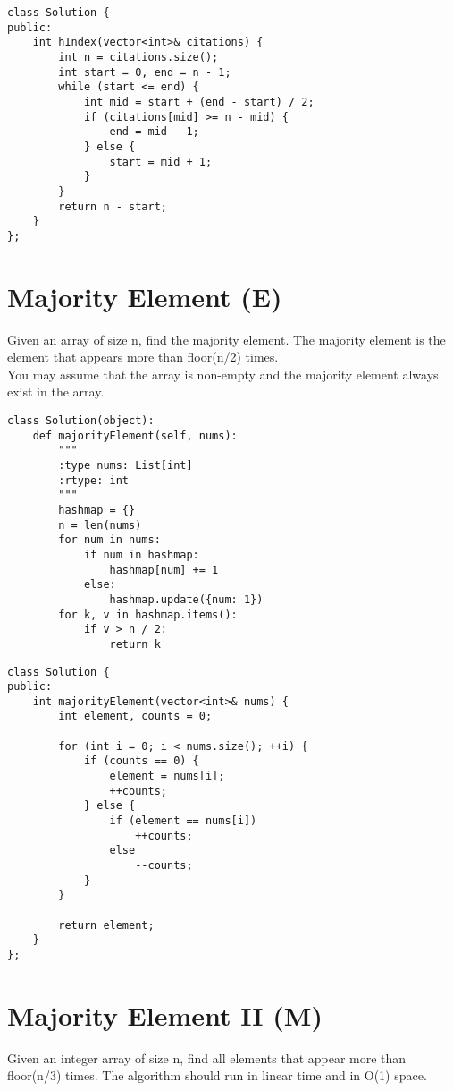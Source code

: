 \begin{lstlisting}
class Solution {
public:
    int hIndex(vector<int>& citations) {
        int n = citations.size();
        int start = 0, end = n - 1;
        while (start <= end) {
            int mid = start + (end - start) / 2;
            if (citations[mid] >= n - mid) {
                end = mid - 1;
            } else {
                start = mid + 1;
            }
        }
        return n - start;
    }
};
\end{lstlisting}


\section{Majority Element (E)}
Given an array of size n, find the majority element. The majority element is the element that appears more than floor(n/2) times.\\

You may assume that the array is non-empty and the majority element always exist in the array.\\

\begin{lstlisting}
class Solution(object):
    def majorityElement(self, nums):
        """
        :type nums: List[int]
        :rtype: int
        """
        hashmap = {}
        n = len(nums)
        for num in nums:
            if num in hashmap:
                hashmap[num] += 1
            else:
                hashmap.update({num: 1})
        for k, v in hashmap.items():
            if v > n / 2:
                return k      
\end{lstlisting}

\begin{lstlisting}
class Solution {
public:
    int majorityElement(vector<int>& nums) {
        int element, counts = 0;
        
        for (int i = 0; i < nums.size(); ++i) {
            if (counts == 0) {
                element = nums[i];
                ++counts;
            } else {
                if (element == nums[i])
                    ++counts;
                else
                    --counts;
            }
        }
        
        return element;
    }
};
\end{lstlisting}


\section{Majority Element II (M)}
Given an integer array of size n, find all elements that appear more than floor(n/3) times. The algorithm should run in linear time and in O(1) space. \\

